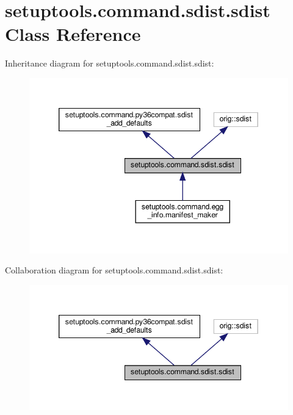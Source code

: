 \hypertarget{classsetuptools_1_1command_1_1sdist_1_1sdist}{}\section{setuptools.\+command.\+sdist.\+sdist Class Reference}
\label{classsetuptools_1_1command_1_1sdist_1_1sdist}


Inheritance diagram for setuptools.\+command.\+sdist.\+sdist\+:
\nopagebreak
\begin{figure}[H]
\begin{center}
\leavevmode
\includegraphics[width=346pt]{classsetuptools_1_1command_1_1sdist_1_1sdist__inherit__graph}
\end{center}
\end{figure}


Collaboration diagram for setuptools.\+command.\+sdist.\+sdist\+:
\nopagebreak
\begin{figure}[H]
\begin{center}
\leavevmode
\includegraphics[width=346pt]{classsetuptools_1_1command_1_1sdist_1_1sdist__coll__graph}
\end{center}
\end{figure}
